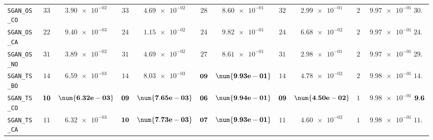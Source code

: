 \begin{table}[H]
\begin{tabularx}{\textwidth}{l||cC|cC|cC|cC|cC||c}
		\texttt{SGAN\_OS\_CO} & $ 33$ & $ \num{3.90e-02}$ & $ 33$ & $ \num{4.69e-02}$ & $ 28$ & $ \num{8.60e-01}$ & $ 32$ & $ \num{2.99e-01}$ & $ 24$ & $ \num{9.97e-01}$ & $ 30.0$  \\
		\texttt{SGAN\_OS\_CA} & $ 22$ & $ \num{9.40e-03}$ & $ 24$ & $ \num{1.15e-02}$ & $ 24$ & $ \num{9.82e-01}$ & $ 24$ & $ \num{6.68e-02}$ & $ 28$ & $ \num{9.97e-01}$ & $ 24.4$  \\
		\texttt{SGAN\_OS\_NO} & $ 31$ & $ \num{3.89e-02}$ & $ 31$ & $ \num{4.69e-02}$ & $ 27$ & $ \num{8.61e-01}$ & $ 31$ & $ \num{2.98e-01}$ & $ 25$ & $ \num{9.97e-01}$ & $ 29.0$  \\
		\texttt{SGAN\_TS\_BO} & $ 14$ & $ \num{6.59e-03}$ & $ 14$ & $ \num{8.03e-03}$ & $\bf 09$ & $\bf \num{9.93e-01}$ & $ 14$ & $ \num{4.78e-02}$ & $ 20$ & $ \num{9.98e-01}$ & $ 14.2$  \\
		\texttt{SGAN\_TS\_CO} & $\bf 10$ & $\bf \num{6.32e-03}$ & $\bf 09$ & $\bf \num{7.65e-03}$ & $\bf 06$ & $\bf \num{9.94e-01}$ & $\bf 09$ & $\bf \num{4.50e-02}$ & $ 14$ & $ \num{9.98e-01}$ & $\bf 9.6$  \\
		\texttt{SGAN\_TS\_CA} & $ 11$ & $ \num{6.32e-03}$ & $\bf 10$ & $\bf \num{7.73e-03}$ & $\bf 07$ & $\bf \num{9.93e-01}$ & $ 11$ & $ \num{4.60e-02}$ & $ 18$ & $ \num{9.98e-01}$ & $ 11.4$  \\

\end{tabularx}
\end{table}
